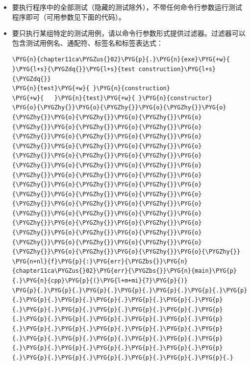 
\begin{itemize}
\item 要执行程序中的全部测试（隐藏的测试除外），不带任何命令行参数运行测试程序即可（可用参数见下面的代码）。



\item 要只执行某组特定的测试用例，请以命令行参数形式提供过滤器。过滤器可以包含测试用例名、通配符、标签名和标签表达式：



\begin{codeblockbg}
\begin{Verbatim}[commandchars=\\\{\},breaklines=true,breakanywhere=true,fontsize=\codefont,xleftmargin=17bp]
\PYG{n}{chapter11ca\PYGZus{}02}\PYG{p}{.}\PYG{n}{exe}\PYG{+w}{ }\PYG{l+s}{\PYGZdq{}}\PYG{l+s}{test construction}\PYG{l+s}{\PYGZdq{}}
\PYG{n}{test}\PYG{+w}{ }\PYG{n}{construction}
\PYG{+w}{   }\PYG{n}{test}\PYG{+w}{ }\PYG{n}{constructor}
\PYG{o}{\PYGZhy{}}\PYG{o}{\PYGZhy{}}\PYG{o}{\PYGZhy{}}\PYG{o}{\PYGZhy{}}\PYG{o}{\PYGZhy{}}\PYG{o}{\PYGZhy{}}\PYG{o}{\PYGZhy{}}\PYG{o}{\PYGZhy{}}\PYG{o}{\PYGZhy{}}\PYG{o}{\PYGZhy{}}\PYG{o}{\PYGZhy{}}\PYG{o}{\PYGZhy{}}\PYG{o}{\PYGZhy{}}\PYG{o}{\PYGZhy{}}\PYG{o}{\PYGZhy{}}\PYG{o}{\PYGZhy{}}\PYG{o}{\PYGZhy{}}\PYG{o}{\PYGZhy{}}\PYG{o}{\PYGZhy{}}\PYG{o}{\PYGZhy{}}\PYG{o}{\PYGZhy{}}\PYG{o}{\PYGZhy{}}\PYG{o}{\PYGZhy{}}\PYG{o}{\PYGZhy{}}\PYG{o}{\PYGZhy{}}\PYG{o}{\PYGZhy{}}\PYG{o}{\PYGZhy{}}\PYG{o}{\PYGZhy{}}\PYG{o}{\PYGZhy{}}\PYG{o}{\PYGZhy{}}\PYG{o}{\PYGZhy{}}\PYG{o}{\PYGZhy{}}\PYG{o}{\PYGZhy{}}\PYG{o}{\PYGZhy{}}\PYG{o}{\PYGZhy{}}\PYG{o}{\PYGZhy{}}\PYG{o}{\PYGZhy{}}\PYG{o}{\PYGZhy{}}\PYG{o}{\PYGZhy{}}\PYG{o}{\PYGZhy{}}\PYG{o}{\PYGZhy{}}\PYG{o}{\PYGZhy{}}\PYG{o}{\PYGZhy{}}\PYG{o}{\PYGZhy{}}\PYG{o}{\PYGZhy{}}\PYG{o}{\PYGZhy{}}\PYG{o}{\PYGZhy{}}\PYG{o}{\PYGZhy{}}\PYG{o}{\PYGZhy{}}
\PYG{n+nl}{f}\PYG{p}{:}\PYG{err}{\PYGZbs{}}\PYG{n}{chapter11ca\PYGZus{}02}\PYG{err}{\PYGZbs{}}\PYG{n}{main}\PYG{p}{.}\PYG{n}{cpp}\PYG{p}{(}\PYG{l+m+mi}{7}\PYG{p}{)}
\PYG{p}{.}\PYG{p}{.}\PYG{p}{.}\PYG{p}{.}\PYG{p}{.}\PYG{p}{.}\PYG{p}{.}\PYG{p}{.}\PYG{p}{.}\PYG{p}{.}\PYG{p}{.}\PYG{p}{.}\PYG{p}{.}\PYG{p}{.}\PYG{p}{.}\PYG{p}{.}\PYG{p}{.}\PYG{p}{.}\PYG{p}{.}\PYG{p}{.}\PYG{p}{.}\PYG{p}{.}\PYG{p}{.}\PYG{p}{.}\PYG{p}{.}\PYG{p}{.}\PYG{p}{.}\PYG{p}{.}\PYG{p}{.}\PYG{p}{.}\PYG{p}{.}\PYG{p}{.}\PYG{p}{.}\PYG{p}{.}\PYG{p}{.}\PYG{p}{.}\PYG{p}{.}\PYG{p}{.}\PYG{p}{.}\PYG{p}{.}\PYG{p}{.}\PYG{p}{.}\PYG{p}{.}\PYG{p}{.}\PYG{p}{.}\PYG{p}{.}\PYG{p}{.}\PYG{p}{.}\PYG{p}{.}

\end{Verbatim}
\end{codeblockbg}
\end{itemize}
